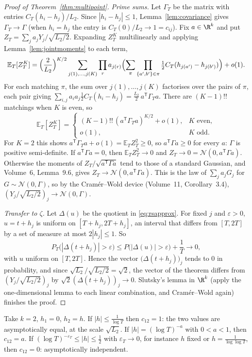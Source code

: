 \begin{proof}[Proof of Theorem~\ref{thm:multipoint}]
\emph{Prime sums.} Let $\Gamma_T$ be the matrix with entries $C_T(h_i-h_j)/L_2$. Since $|h_i-h_j|\le1$, Lemma~\ref{lem:covariance} gives $\Gamma_T\to\Gamma$ (when $h_i=h_j$ the entry is $C_T(0)/L_2\to1=c_{ij}$). Fix $a\in\R^k$ and put $Z_T=\sum_ja_jY_j/\sqrt{L_2/2}$. Expanding $Z_T^K$ multilinearly and applying Lemma~\ref{lem:jointmoments} to each term,
\[
\mathbb E_T[Z_T^K]=\Bigl(\frac2{L_2}\Bigr)^{K/2}\sum_{j(1),\dots,j(K)}\prod_ra_{j(r)}\Bigl(\sum_\pi\prod_{\{a',b'\}\in\pi}\tfrac12C_T(h_{j(a')}-h_{j(b')})\Bigr)+o(1).
\]
For each matching $\pi$, the sum over $j(1),\dots,j(K)$ factorises over the pairs of $\pi$, each pair giving $\sum_{i,j}a_ia_j\frac12C_T(h_i-h_j)=\frac{L_2}2\,a^{\mathsf T}\Gamma_Ta$. There are $(K-1)!!$ matchings when $K$ is even, so
\[
\mathbb E_T[Z_T^K]=\begin{cases}(K-1)!!\,(a^{\mathsf T}\Gamma_Ta)^{K/2}+o(1),&K\text{ even},\\o(1),&K\text{ odd}.\end{cases}
\]
For $K=2$ this shows $a^{\mathsf T}\Gamma_Ta+o(1)=\mathbb E_TZ_T^2\ge0$, so $a^{\mathsf T}\Gamma a\ge0$ for every $a$: $\Gamma$ is positive semi-definite. If $a^{\mathsf T}\Gamma a=0$, then $\mathbb E_TZ_T^2\to0$ and $Z_T\to0=\mathcal N(0,a^{\mathsf T}\Gamma a)$. Otherwise the moments of $Z_T/\sqrt{a^{\mathsf T}\Gamma a}$ tend to those of a standard Gaussian, and Volume~6, Lemma~9.6, gives $Z_T\to\mathcal N(0,a^{\mathsf T}\Gamma a)$. This is the law of $\sum_ja_jG_j$ for $G\sim\mathcal N(0,\Gamma)$, so by the Cram\'er--Wold device (Volume~11, Corollary~3.4), $(Y_j/\sqrt{L_2/2})_j\to\mathcal N(0,\Gamma)$.

\emph{Transfer to $\zeta$.} Let $\Delta(u)$ be the quotient in \eqref{eq:rsapprox}. For fixed $j$ and $\varepsilon>0$, $u=t+h_j$ is uniform on $[T+h_j,2T+h_j]$, an interval that differs from $[T,2T]$ by a set of measure at most $2|h_j|\le1$. So
\[
P_T\bigl(|\Delta(t+h_j)|>\varepsilon\bigr)\le P\bigl(|\Delta(u)|>\varepsilon\bigr)+\frac1T\longrightarrow0,
\]
with $u$ uniform on $[T,2T]$. Hence the vector $\bigl(\Delta(t+h_j)\bigr)_j$ tends to $0$ in probability, and since $\sqrt{L_2}/\sqrt{L_2/2}=\sqrt2$, the vector of the theorem differs from $(Y_j/\sqrt{L_2/2})_j$ by $\sqrt2(\Delta(t+h_j))_j\to0$. Slutsky's lemma in $\R^k$ (apply the one-dimensional lemma to each linear combination, and Cram\'er--Wold again) finishes the proof.
\end{proof}

\begin{example}\label{exa:regimes}
Take $k=2$, $h_1=0$, $h_2=h$. If $|h|\le\frac1{\log T}$ then $c_{12}=1$: the two values are asymptotically equal, at the scale $\sqrt{L_2}$. If $|h|=(\log T)^{-a}$ with $0<a<1$, then $c_{12}=a$. If $(\log T)^{-\varepsilon_T}\le|h|\le\frac12$ with $\varepsilon_T\to0$, for instance $h$ fixed or $h=\frac1{\log\log T}$, then $c_{12}=0$: asymptotically independent.
\end{example}

